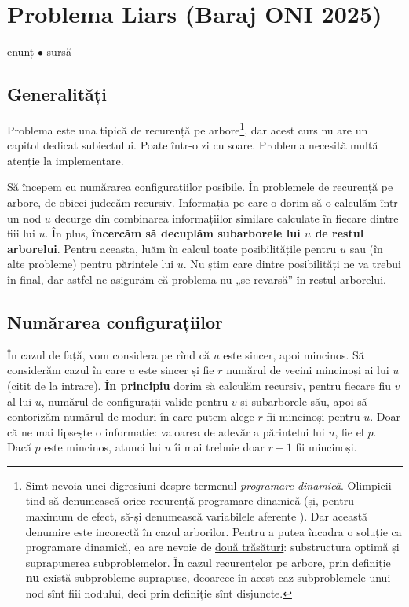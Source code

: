 \documentclass[../main.tex]{subfiles}
\begin{document}
\section{Problema Liars (Baraj ONI 2025)}
\label{problem:liars}

\href{https://kilonova.ro/problems/3730}{enunț}
$\bullet$
\hyperref[code:liars]{sursă}

\subsection{Generalități}

Problema este una tipică de recurență pe arbore\footnote{Simt nevoia unei digresiuni despre termenul \textit{programare dinamică}. Olimpicii tind să denumească orice recurență programare dinamică (și, pentru maximum de efect, să-și denumească variabilele aferente ). Dar această denumire este incorectă în cazul arborilor. Pentru a putea încadra o soluție ca programare dinamică, ea are nevoie de \href{https://en.wikipedia.org/wiki/Dynamic_programming\#Computer_science}{două trăsături}: substructura optimă și suprapunerea subproblemelor. În cazul recurențelor pe arbore, prin definiție \textbf{nu} există subprobleme suprapuse, deoarece în acest caz subproblemele unui nod sînt fiii nodului, deci prin definiție sînt disjuncte.}, dar acest curs nu are un capitol dedicat subiectului. Poate într-o zi cu soare. Problema necesită multă atenție la implementare.

Să începem cu numărarea configurațiilor posibile. În problemele de recurență pe arbore, de obicei judecăm recursiv. Informația pe care o dorim să o calculăm într-un nod $u$ decurge din combinarea informațiilor similare calculate în fiecare dintre fiii lui $u$. În plus, \textbf{încercăm să decuplăm subarborele lui $u$ de restul arborelui}. Pentru aceasta, luăm în calcul toate posibilitățile pentru $u$ sau (în alte probleme) pentru părintele lui $u$. Nu știm care dintre posibilități ne va trebui în final, dar astfel ne asigurăm că problema nu „se revarsă” în restul arborelui.

\subsection{Numărarea configurațiilor}

În cazul de față, vom considera pe rînd că $u$ este sincer, apoi mincinos. Să considerăm cazul în care $u$ este sincer și fie $r$ numărul de vecini mincinoși ai lui $u$ (citit de la intrare). \textbf{În principiu} dorim să calculăm recursiv, pentru fiecare fiu $v$ al lui $u$, numărul de configurații valide pentru $v$ și subarborele său, apoi să contorizăm numărul de moduri în care putem alege $r$ fii mincinoși pentru $u$. Doar că ne mai lipsește o informație: valoarea de adevăr a părintelui lui $u$, fie el $p$. Dacă $p$ este mincinos, atunci lui $u$ îi mai trebuie doar $r-1$ fii mincinoși.
\end{document}
